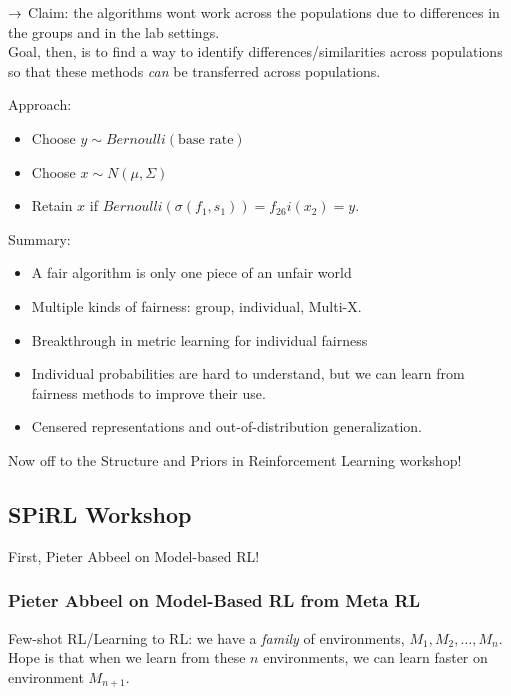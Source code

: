 $\rightarrow$ Claim: the algorithms wont work across the populations due to differences in the groups and in the lab settings. \\

Goal, then, is to find a way to identify differences/similarities across populations so that these methods {\it can} be transferred across populations.

Approach:
\begin{itemize}
    \item Choose $y \sim Bernoulli(\text{base rate})$
    \item Choose $x \sim N(\mu, \Sigma)$
    \item Retain $x$ if $Bernoulli(\sigma(f_1,s_1)) = f_26i(x_2) = y$.
\end{itemize}


Summary:
\begin{itemize}
    \item A fair algorithm is only one piece of an unfair world
    \item Multiple kinds of fairness: group, individual, Multi-X.
    \item Breakthrough in metric learning for individual fairness
    \item Individual probabilities are hard to understand, but we can  learn from fairness methods to improve their use.
    \item Censered representations and out-of-distribution generalization.
\end{itemize}

\spacerule


Now off to the Structure and Priors in Reinforcement Learning workshop!


\subsection{SPiRL Workshop}
\label{sec:spirl}

First, Pieter Abbeel on Model-based RL!

\subsubsection{Pieter Abbeel on Model-Based RL from Meta RL}

Few-shot RL/Learning to RL: we have a {\it family} of environments, $M_1, M_2, \ldots, M_n$. Hope is that when we learn from these $n$ environments, we can learn faster on environment $M_{n+1}$. \\

